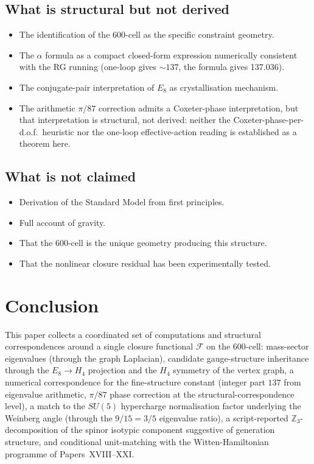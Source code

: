 \documentclass[12pt]{article}
\newcommand{\Fcal}{\mathcal{F}}
\begin{document}
\subsection{What is structural but not derived}

\begin{itemize}
    \item The identification of the 600-cell as the specific constraint geometry.
    \item The $\alpha$ formula as a compact closed-form expression numerically consistent with the RG running (one-loop gives $\sim 137$, the formula gives 137.036).
    \item The conjugate-pair interpretation of $E_8$ as crystallisation mechanism.
    \item The arithmetic $\pi/87$ correction admits a Coxeter-phase interpretation, but that interpretation is structural, not derived: neither the Coxeter-phase-per-d.o.f.\ heuristic nor the one-loop effective-action reading is established as a theorem here.
\end{itemize}

\subsection{What is not claimed}

\begin{itemize}
    \item Derivation of the Standard Model from first principles.
    \item Full account of gravity.
    \item That the 600-cell is the unique geometry producing this structure.
    \item That the nonlinear closure residual has been experimentally tested.
\end{itemize}

\section{Conclusion}\label{sec:conclusion}

This paper collects a coordinated set of computations and structural correspondences around a single closure functional $\Fcal$ on the 600-cell: mass-sector eigenvalues (through the graph Laplacian), candidate gauge-structure inheritance through the $E_8 \to H_4$ projection and the $H_4$ symmetry of the vertex graph, a numerical correspondence for the fine-structure constant (integer part $137$ from eigenvalue arithmetic, $\pi/87$ phase correction at the structural-correspondence level), a match to the $SU(5)$ hypercharge normalisation factor underlying the Weinberg angle (through the $9/15 = 3/5$ eigenvalue ratio), a script-reported $\mathbb{Z}_3$-decomposition of the spinor isotypic component suggestive of generation structure, and conditional unit-matching with the Witten-Hamiltonian programme of Papers~XVIII--XXI.
\end{document}
